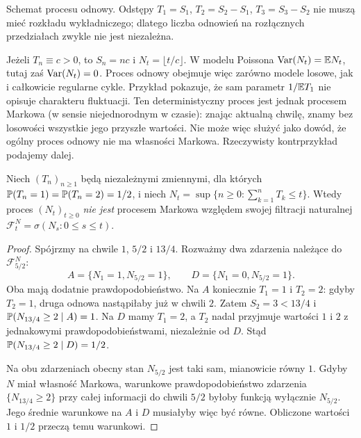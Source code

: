 \begin{center}
\par\smallskip\small Schemat procesu odnowy. Odstępy
$T_1=S_1$, $T_2=S_2-S_1$, $T_3=S_3-S_2$ nie muszą mieć rozkładu
wykładniczego; dlatego liczba odnowień na rozłącznych przedziałach
zwykle nie jest niezależna.
\end{center}

\begin{przyklad}
Jeżeli $T_n\equiv c>0$, to $S_n=nc$ i
$N_t=\lfloor t/c\rfloor$. W modelu Poissona
$\operatorname{Var}(N_t)=\mathbb{E} N_t$, tutaj zaś $\operatorname{Var}(N_t)=0$.
Proces odnowy obejmuje więc zarówno modele losowe, jak i
całkowicie regularne cykle. Przykład pokazuje, że sam parametr
$1/\mathbb{E} T_1$ nie opisuje charakteru fluktuacji.
Ten deterministyczny proces jest jednak procesem Markowa
(w sensie niejednorodnym w czasie): znając aktualną chwilę,
znamy bez losowości wszystkie jego przyszłe wartości.
Nie może więc służyć jako dowód, że ogólny proces odnowy
nie ma własności Markowa. Rzeczywisty kontrprzykład podajemy dalej.
\end{przyklad}


\begin{twierdzenie}
Niech $(T_n)_{n\ge1}$ będą niezależnymi zmiennymi, dla których
$\mathbb{P}(T_n=1)=\mathbb{P}(T_n=2)=1/2$, i niech
$N_t=\sup\{n\ge0:\sum_{k=1}^nT_k\le t\}$.
Wtedy proces $(N_t)_{t\ge0}$ \emph{nie jest} procesem Markowa
względem swojej filtracji naturalnej
$\mathcal F_t^N=\sigma(N_s:0\le s\le t)$.
\end{twierdzenie}
\begin{proof}
Spójrzmy na chwile $1$, $5/2$ i $13/4$.
Rozważmy dwa zdarzenia należące do $\mathcal F_{5/2}^N$:
\[
A=\{N_1=1,N_{5/2}=1\},\qquad
D=\{N_1=0,N_{5/2}=1\}.
\]
Oba mają dodatnie prawdopodobieństwo.
Na $A$ koniecznie $T_1=1$ i $T_2=2$: gdyby
$T_2=1$, druga odnowa nastąpiłaby już w chwili $2$.
Zatem $S_2=3<13/4$ i
$\mathbb{P}(N_{13/4}\ge2\mid A)=1$.
Na $D$ mamy $T_1=2$, a $T_2$ nadal przyjmuje wartości
$1$ i $2$ z jednakowymi prawdopodobieństwami,
niezależnie od $D$. Stąd
$\mathbb{P}(N_{13/4}\ge2\mid D)=1/2$.

Na obu zdarzeniach obecny stan $N_{5/2}$ jest taki sam,
mianowicie równy $1$. Gdyby $N$ miał własność Markowa,
warunkowe prawdopodobieństwo zdarzenia
$\{N_{13/4}\ge2\}$ przy całej informacji do chwili $5/2$
byłoby funkcją wyłącznie $N_{5/2}$. Jego średnie
warunkowe na $A$ i $D$ musiałyby więc być równe.
Obliczone wartości $1$ i $1/2$ przeczą temu warunkowi.
\end{proof}

